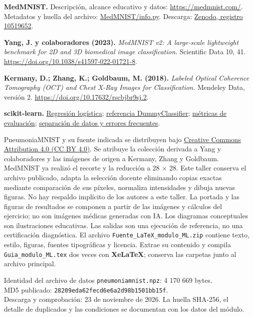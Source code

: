 \begin{enumerate}[label={[\arabic*]},leftmargin=2em]
\item \textbf{MedMNIST.} Descripción, alcance educativo y datos: \url{https://medmnist.com/}. Metadatos y huella del archivo: \href{https://github.com/MedMNIST/MedMNIST/blob/main/medmnist/info.py}{MedMNIST/info.py}. Descarga: \href{https://zenodo.org/records/10519652}{Zenodo, registro 10519652}.
\item \textbf{Yang, J. y colaboradores (2023).} \emph{MedMNIST v2: A large-scale lightweight benchmark for 2D and 3D biomedical image classification.} Scientific Data 10, 41.\\ \url{https://doi.org/10.1038/s41597-022-01721-8}.
\item \textbf{Kermany, D.; Zhang, K.; Goldbaum, M. (2018).} \emph{Labeled Optical Coherence Tomography (OCT) and Chest X-Ray Images for Classification.} Mendeley Data, versión 2. \url{https://doi.org/10.17632/rscbjbr9sj.2}.
\item \textbf{scikit-learn.} \href{https://scikit-learn.org/stable/modules/generated/sklearn.linear_model.LogisticRegression.html}{Regresión logística}; \href{https://scikit-learn.org/stable/modules/generated/sklearn.dummy.DummyClassifier.html}{referencia DummyClassifier}; \href{https://scikit-learn.org/stable/modules/model_evaluation.html}{métricas de evaluación}; \href{https://scikit-learn.org/stable/common_pitfalls.html}{separación de datos y errores frecuentes}.
\end{enumerate}
PneumoniaMNIST y su fuente indicada se distribuyen bajo \href{https://creativecommons.org/licenses/by/4.0/}{Creative Commons Attribution 4.0 (CC BY 4.0)}. Se atribuye la colección derivada a Yang y colaboradores y las imágenes de origen a Kermany, Zhang y Goldbaum. MedMNIST ya realizó el recorte y la reducción a 28 × 28. Este taller conserva el archivo publicado, adapta la selección docente eliminando copias exactas mediante comparación de sus píxeles, normaliza intensidades y dibuja nuevas figuras. No hay respaldo implícito de los autores a este taller.
La portada y las figuras de resultados se componen a partir de las imágenes y cálculos del ejercicio; no son imágenes médicas generadas con IA. Los diagramas conceptuales son ilustraciones educativas. Las salidas son una ejecución de referencia, no una certificación diagnóstica.
El archivo \texttt{Fuente\_LaTeX\_modulo\_ML.zip} contiene texto, estilo, figuras, fuentes tipográficas y licencia. Extrae su contenido y compila \texttt{Guia\_modulo\_ML.tex} dos veces con \textbf{XeLaTeX}; conserva las carpetas junto al archivo principal.
\begin{Idea}{Identidad del archivo de datos}
\texttt{pneumoniamnist.npz}: 4 170 669 bytes.\\
MD5 publicado: \texttt{28209eda62fecd6e6a2d98b1501bb15f}.\\
Descarga y comprobación: 23 de noviembre de 2026. La huella SHA-256, el detalle de duplicados y las condiciones se documentan con los datos del módulo.
\end{Idea}

